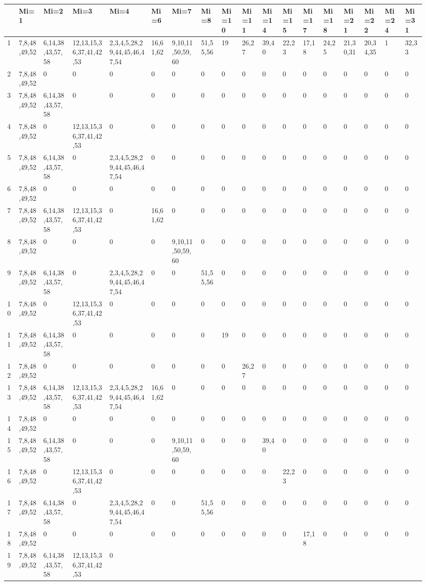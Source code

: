 \documentclass[
]{article}
\begin{document}
\begin{longtable}[]{@{}llllllllllllllllll@{}}
\toprule
& Mi=1 & Mi=2 & Mi=3 & Mi=4 & Mi=6 & Mi=7 & Mi=8 & Mi=10 & Mi=11 & Mi=14
& Mi=15 & Mi=17 & Mi=18 & Mi=21 & Mi=22 & Mi=24 & Mi=31\tabularnewline
\midrule
\endhead
1 & 7,8,48,49,52 & 6,14,38,43,57,58 & 12,13,15,36,37,41,42,53 &
2,3,4,5,28,29,44,45,46,47,54 & 16,61,62 & 9,10,11,50,59,60 & 51,55,56 &
19 & 26,27 & 39,40 & 22,23 & 17,18 & 24,25 & 21,30,31 & 20,34,35 & 1 &
32,33\tabularnewline
2 & 7,8,48,49,52 & 0 & 0 & 0 & 0 & 0 & 0 & 0 & 0 & 0 & 0 & 0 & 0 & 0 & 0
& 0 & 0\tabularnewline
3 & 7,8,48,49,52 & 6,14,38,43,57,58 & 0 & 0 & 0 & 0 & 0 & 0 & 0 & 0 & 0
& 0 & 0 & 0 & 0 & 0 & 0\tabularnewline
4 & 7,8,48,49,52 & 0 & 12,13,15,36,37,41,42,53 & 0 & 0 & 0 & 0 & 0 & 0 &
0 & 0 & 0 & 0 & 0 & 0 & 0 & 0\tabularnewline
5 & 7,8,48,49,52 & 6,14,38,43,57,58 & 0 & 2,3,4,5,28,29,44,45,46,47,54 &
0 & 0 & 0 & 0 & 0 & 0 & 0 & 0 & 0 & 0 & 0 & 0 & 0\tabularnewline
6 & 7,8,48,49,52 & 0 & 0 & 0 & 0 & 0 & 0 & 0 & 0 & 0 & 0 & 0 & 0 & 0 & 0
& 0 & 0\tabularnewline
7 & 7,8,48,49,52 & 6,14,38,43,57,58 & 12,13,15,36,37,41,42,53 & 0 &
16,61,62 & 0 & 0 & 0 & 0 & 0 & 0 & 0 & 0 & 0 & 0 & 0 & 0\tabularnewline
8 & 7,8,48,49,52 & 0 & 0 & 0 & 0 & 9,10,11,50,59,60 & 0 & 0 & 0 & 0 & 0
& 0 & 0 & 0 & 0 & 0 & 0\tabularnewline
9 & 7,8,48,49,52 & 6,14,38,43,57,58 & 0 & 2,3,4,5,28,29,44,45,46,47,54 &
0 & 0 & 51,55,56 & 0 & 0 & 0 & 0 & 0 & 0 & 0 & 0 & 0 & 0\tabularnewline
10 & 7,8,48,49,52 & 0 & 12,13,15,36,37,41,42,53 & 0 & 0 & 0 & 0 & 0 & 0
& 0 & 0 & 0 & 0 & 0 & 0 & 0 & 0\tabularnewline
11 & 7,8,48,49,52 & 6,14,38,43,57,58 & 0 & 0 & 0 & 0 & 0 & 19 & 0 & 0 &
0 & 0 & 0 & 0 & 0 & 0 & 0\tabularnewline
12 & 7,8,48,49,52 & 0 & 0 & 0 & 0 & 0 & 0 & 0 & 26,27 & 0 & 0 & 0 & 0 &
0 & 0 & 0 & 0\tabularnewline
13 & 7,8,48,49,52 & 6,14,38,43,57,58 & 12,13,15,36,37,41,42,53 &
2,3,4,5,28,29,44,45,46,47,54 & 16,61,62 & 0 & 0 & 0 & 0 & 0 & 0 & 0 & 0
& 0 & 0 & 0 & 0\tabularnewline
14 & 7,8,48,49,52 & 0 & 0 & 0 & 0 & 0 & 0 & 0 & 0 & 0 & 0 & 0 & 0 & 0 &
0 & 0 & 0\tabularnewline
15 & 7,8,48,49,52 & 6,14,38,43,57,58 & 0 & 0 & 0 & 9,10,11,50,59,60 & 0
& 0 & 0 & 39,40 & 0 & 0 & 0 & 0 & 0 & 0 & 0\tabularnewline
16 & 7,8,48,49,52 & 0 & 12,13,15,36,37,41,42,53 & 0 & 0 & 0 & 0 & 0 & 0
& 0 & 22,23 & 0 & 0 & 0 & 0 & 0 & 0\tabularnewline
17 & 7,8,48,49,52 & 6,14,38,43,57,58 & 0 & 2,3,4,5,28,29,44,45,46,47,54
& 0 & 0 & 51,55,56 & 0 & 0 & 0 & 0 & 0 & 0 & 0 & 0 & 0 &
0\tabularnewline
18 & 7,8,48,49,52 & 0 & 0 & 0 & 0 & 0 & 0 & 0 & 0 & 0 & 0 & 17,18 & 0 &
0 & 0 & 0 & 0\tabularnewline
19 & 7,8,48,49,52 & 6,14,38,43,57,58 & 12,13,15,36,37,41,42,53 & 0 &

\end{longtable}
\end{document}
